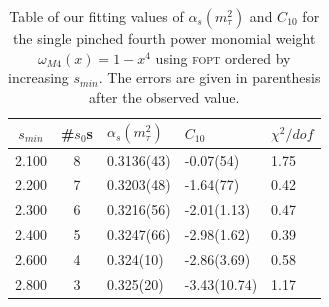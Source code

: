 \documentclass[../../index.tex]{subfiles}
\begin{document}
\begin{table}
  \centering
  \begin{tabularx}{\textwidth}{ccYYY}
    \toprule
    \(s_{min}\) & \#\(s_0\)s & \(\alpha_s(m_\tau^2)\) & \(C_{10}\) & \(\chi^2/dof\)  \\
    \midrule
    2.100 & 8  & 0.3136(43) & -0.07(54) & 1.75 \\
    2.200 & 7  & 0.3203(48) & -1.64(77) & 0.42 \\
    2.300 & 6  & 0.3216(56) & -2.01(1.13) & 0.47 \\
    2.400 & 5  & 0.3247(66) & -2.98(1.62) & 0.39 \\
    2.600 & 4  & 0.324(10) & -2.86(3.69) & 0.58 \\
    2.800 & 3  & 0.325(20) & -3.43(10.74) & 1.17 \\
    \bottomrule
  \end{tabularx}
  \caption{Table of our fitting values of \(\alpha_s(m_\tau^2)\) and \(C_{10}\)
    for the single pinched fourth power monomial weight \(\omega_{M4}(x)=1-x^4\)
    using \textsc{fopt} ordered by increasing \(s_{min}\). The errors are given
    in parenthesis after the observed value.}
  \label{table:fitWM4AlD10}
\end{table}
\end{document}
